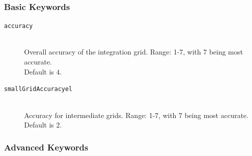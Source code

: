 \documentclass[bibliography=totocnumbered,a4paper,10pt,oneside]{scrbook}
\begin{document}
\subsubsection{Basic Keywords}
\begin{description}
  \item [\texttt{accuracy}]\hfill \\
  Overall accuracy of the integration grid. Range: 1-7, with 7 being most accurate.\\ Default is $4$.
 \item [\texttt{smallGridAccuracyel}]\hfill \\
 Accuracy for intermediate grids. Range: 1-7, with 7 being most accurate. Default is $2$.
\end{description}
\subsubsection{Advanced Keywords}
\end{document}
